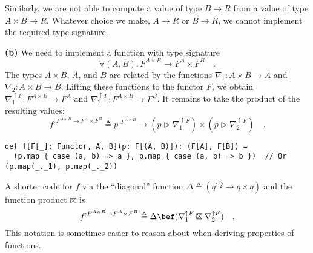 Similarly, we are not able to compute a value of type $B\rightarrow R$
from a value of type $A\times B\rightarrow R$. Whatever choice we
make, $A\rightarrow R$ or $B\rightarrow R$, we cannot implement
the required type signature.

\textbf{(b)} We need to implement a function with type signature
\[
\forall(A,B).\,F^{A\times B}\rightarrow F^{A}\times F^{B}\quad.
\]
The types $A\times B$, $A$, and $B$ are related by the functions
$\nabla_{1}:A\times B\rightarrow A$ and $\nabla_{2}:A\times B\rightarrow B$.
Lifting these functions to the functor $F$, we obtain $\nabla_{1}^{\uparrow F}:F^{A\times B}\rightarrow F^{A}$
and $\nabla_{2}^{\uparrow F}:F^{A\times B}\rightarrow F^{B}$. It
remains to take the product of the resulting values:
\[
f^{:F^{A\times B}\rightarrow F^{A}\times F^{B}}\triangleq p^{:F^{A\times B}}\rightarrow(p\triangleright\nabla_{1}^{\uparrow F})\times(p\triangleright\nabla_{2}^{\uparrow F})\quad.
\]
\begin{lstlisting}
def f[F[_]: Functor, A, B](p: F[(A, B)]): (F[A], F[B]) =
  (p.map { case (a, b) => a }, p.map { case (a, b) => b })  // Or (p.map(_._1), p.map(_._2))
\end{lstlisting}
A shorter code for $f$ via the ``diagonal'' function $\Delta\triangleq(q^{:Q}\rightarrow q\times q)$
and the function product $\boxtimes$ is
\[
f^{:F^{A\times B}\rightarrow F^{A}\times F^{B}}\triangleq\Delta\bef(\nabla_{1}^{\uparrow F}\boxtimes\nabla_{2}^{\uparrow F})\quad.
\]
This notation is sometimes easier to reason about when deriving properties
of functions.

